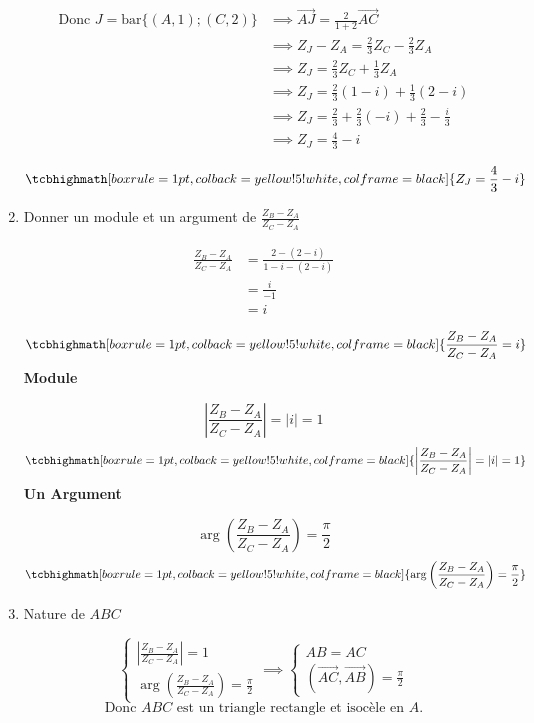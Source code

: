 \documentclass[12pt,a4paper]{article}
\begin{document}
\begin{enumerate}
\begin{align*}
\text{Donc } J = \text{bar}\{(A,1); (C,2)\} &\implies \overrightarrow{AJ} = \frac{2}{1+2} \overrightarrow{AC}\\
															 &\implies Z_J - Z_A = \frac{2}{3} Z_C - \frac{2}{3} Z_A\\
                               &\implies Z_J = \frac{2}{3} Z_C + \frac{1}{3} Z_A\\
                               &\implies Z_J = \frac{2}{3} (1 - i) + \frac{1}{3} (2 - i)\\
                               &\implies Z_J = \frac{2}{3} + \frac{2}{3} (-i) + \frac{2}{3} - \frac{i}{3}\\
                               &\implies Z_J = \frac{4}{3} - i
\end{align*}

\[
\tcbhighmath[boxrule=1pt, colback=yellow!5!white, colframe=black]{ Z_J = \frac{4}{3} - i }
\]
\item Donner un module et un argument de $\frac{Z_B - Z_A}{Z_C - Z_A}$

\begin{align*}
\frac{Z_B - Z_A}{Z_C - Z_A} &= \frac{2 - (2 - i)}{1 - i - (2 - i)}\\
														&= \frac{i}{-1}\\
														&= i
\end{align*}

\[
\tcbhighmath[boxrule=1pt, colback=yellow!5!white, colframe=black]{ \frac{Z_B - Z_A}{Z_C - Z_A} = i }
\]
\textbf{Module}

\[
\left| \frac{Z_B - Z_A}{Z_C - Z_A} \right| = |i| = 1
\]
\[
\tcbhighmath[boxrule=1pt, colback=yellow!5!white, colframe=black]{ \left| \frac{Z_B - Z_A}{Z_C - Z_A} \right| = |i| = 1 }
\]
\textbf{Un Argument}

\[
\arg\left( \frac{Z_B - Z_A}{Z_C - Z_A} \right) = \frac{\pi}{2}
\]
\[
\tcbhighmath[boxrule=1pt, colback=yellow!5!white, colframe=black]{ \arg\left( \frac{Z_B - Z_A}{Z_C - Z_A} \right) = \frac{\pi}{2} }
\]
\item Nature de $ABC$

\[
\begin{cases}
\left| \frac{Z_B - Z_A}{Z_C - Z_A} \right| = 1\\
\arg\left( \frac{Z_B - Z_A}{Z_C - Z_A} \right) = \frac{\pi}{2} 
\end{cases}\implies
\begin{cases}
AB = AC\\
\left(\overrightarrow{AC},\overrightarrow{AB} \right) = \frac{\pi}{2}
\end{cases}
\]
\[
\text{Donc } ABC \text{ est un triangle rectangle et isocèle en } A.
\]


\end{enumerate}
\end{document}
